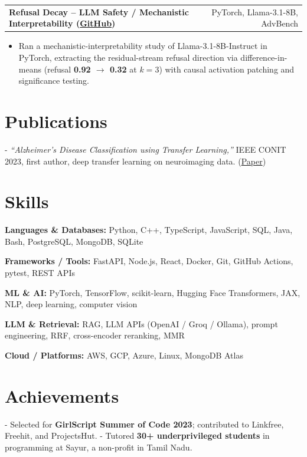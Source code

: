 \documentclass[letterpaper,11pt]{article}
\makeatletter
\newcommand{\projItem}[2]{%
  \vspace{6pt}
  \begin{tabular*}{\textwidth}{@{}l@{\extracolsep{\fill}}r@{}}
    \textbf{#1} & #2 \\
  \end{tabular*}\par\vspace{-2pt}
}
\newcommand{\skillLine}[2]{\textbf{#1:} #2\par\vspace{2pt}}
\newcommand{\inlineBlock}[1]{{\setlength{\leftskip}{0.18in}\small #1\par}}
\makeatother
\begin{document}
\projItem{Refusal Decay -- LLM Safety / Mechanistic Interpretability {\normalfont\small(\href{https://github.com/Deva-1903/refusal-decay}{GitHub})}}{PyTorch, Llama-3.1-8B, AdvBench}
\begin{itemize}
  \item Ran a mechanistic-interpretability study of Llama-3.1-8B-Instruct in PyTorch, extracting the residual-stream refusal direction via difference-in-means (refusal \textbf{0.92 $\to$ 0.32} at $k{=}3$) with causal activation patching and significance testing.
\end{itemize}

\section{Publications}
\inlineBlock{- \textit{``Alzheimer's Disease Classification using Transfer Learning,''} IEEE CONIT 2023, first author, deep transfer learning on neuroimaging data. {\normalfont\small(\href{https://ieeexplore.ieee.org/document/10205760}{Paper})}}

\section{Skills}
\skillLine{Languages \& Databases}{Python, C++, TypeScript, JavaScript, SQL, Java, Bash, PostgreSQL, MongoDB, SQLite}
\skillLine{Frameworks / Tools}{FastAPI, Node.js, React, Docker, Git, GitHub Actions, pytest, REST APIs}
\skillLine{ML \& AI}{PyTorch, TensorFlow, scikit-learn, Hugging Face Transformers, JAX, NLP, deep learning, computer vision}
\skillLine{LLM \& Retrieval}{RAG, LLM APIs (OpenAI / Groq / Ollama), prompt engineering, RRF, cross-encoder reranking, MMR}
\skillLine{Cloud / Platforms}{AWS, GCP, Azure, Linux, MongoDB Atlas}

\section{Achievements}
\inlineBlock{- Selected for \textbf{GirlScript Summer of Code 2023}; contributed to Linkfree, Freehit, and ProjectsHut. - Tutored \textbf{30+ underprivileged students} in programming at Sayur, a non-profit in Tamil Nadu.}
\end{document}
